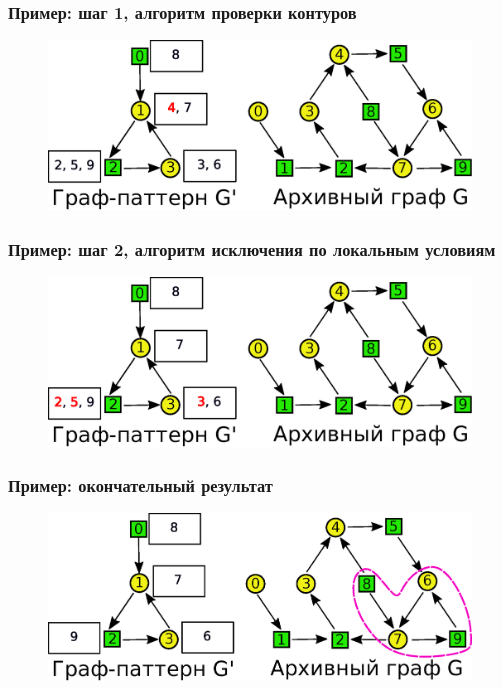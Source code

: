 \documentclass{beamer}
\begin{document}
\begin{frame}
\frametitle{Пример: шаг 1, алгоритм проверки контуров}
\begin{figure}[H]
	\centering
	\includegraphics[width=1\textwidth]{ee4}
	\label{fig:ee4}
\end{figure}
\end{frame}

\begin{frame}
\frametitle{Пример: шаг 2, алгоритм исключения по локальным условиям}
\begin{figure}[H]
	\centering
	\includegraphics[width=1\textwidth]{ee5}
	\label{fig:ee5}
\end{figure}
\end{frame}

\begin{frame}
\frametitle{Пример: окончательный результат}
\begin{figure}[H]
	\centering
	\includegraphics[width=1\textwidth]{ee7}
	\label{fig:ee7}
\end{figure}
\end{frame}
\end{document}
